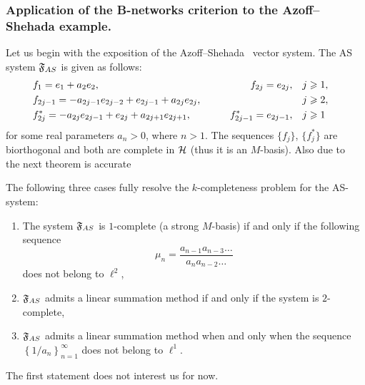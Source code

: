 \documentclass[12pt]{article}
\begin{document}
    \subsubsection{Application of the B-networks criterion to the Azoff--Shehada example.}
      Let us begin with the exposition of the Azoff--Shehada~\cite{azoff} vector system.
      The AS system $\fsys_{AS}$ is given as follows:
      \begin{equation}
        \label{as-system}
        \begin{aligned}
          &f_1 = e_1 + a_2 e_2, \qquad &f_{2j}=e_{2j}, \quad&j \geq 1,&\\
          &f_{2j-1}=-a_{2j-1}e_{2j-2} + e_{2j-1} + a_{2j}e_{2j}, \qquad &\makebox[5em]{} \quad&j \geq 2,&\\
          &f^*_{2j}=-a_{2j}e_{2j-1}+e_{2j}+a_{2j+1}e_{2j+1}, \qquad &f^*_{2j-1}=e_{2j-1}, \quad&j \geq 1&
        \end{aligned}
      \end{equation}
        for some real parameters $a_n > 0$, where $n > 1$.
      The sequences $\{f_j\}$, $\{f^*_j\}$ are biorthogonal and both are complete in $\cal{H}$ (thus it is an $M$-basis).
      Also due to~\cite{katavolos} the next theorem is accurate
      \begin{theorem}
        \label{thm-katavolos}
        The following three cases fully resolve the $k$-completeness problem for the AS-system:
        \begin{enumerate}[label=(\alph*)]
          \item The system $\fsys_{AS}$ is $1$-complete (a strong $M$-basis) if and only if the following sequence
            \begin{equation*}
              \mu_n = \frac{a_{n-1} a_{n-3} \dots}{a_{n} a_{n-2} \dots }
            \end{equation*}
              does not belong to $\ell^2$,
          \item \label{pt2} $\fsys_{AS}$ admits a linear summation method if and only if the system is $2$-complete,
          \item \label{pt3} $\fsys_{AS}$ admits a linear summation method when and only when
            the sequence $\left\{1/a_n\right\}_{n=1}^\infty$ does not belong to $\ell^1$.
        \end{enumerate}
      \end{theorem}
      The first statement does not interest us for now.
\end{document}
